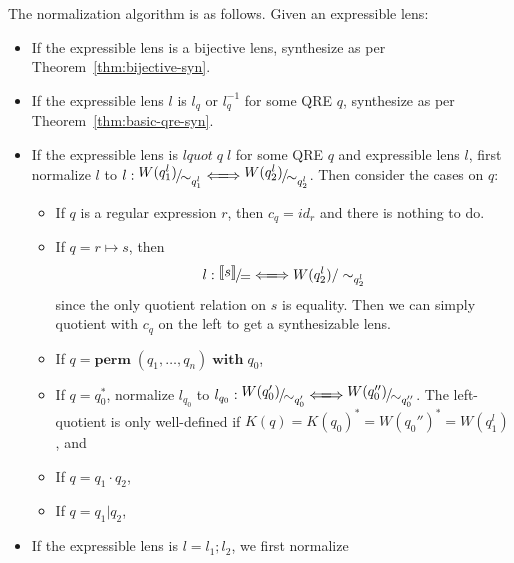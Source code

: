 \documentclass[a4paper,11pt] {article}
\theoremstyle{definition}
\newcommand{\lquot}{\textit{lquot}}
\newcommand{\lensbetween}[1]{\xLongleftrightarrow{#1}}
\newcommand{\perm}{ \textbf{perm}\; }
\newcommand{\with}{ \;\textbf{with}\; }
\newcommand{\niceFrac}[2]{%
    \raise.5ex\hbox{$#1$}%
    \kern-.1em/\kern-.15em%
    \lower.25ex\hbox{$#2$}}
\begin{document}
The normalization algorithm is as follows. Given an expressible lens:
\begin{itemize}
\item If the expressible lens is a bijective lens, synthesize as per
  Theorem~\ref{thm:bijective-syn}.
\item If the expressible lens $l$ is $l_q$ or $l_q^{-1}$ for some QRE
  $q$, synthesize as per Theorem~\ref{thm:basic-qre-syn}.
\item If the expressible lens is $\lquot \; q \; l$ for some QRE $q$
  and expressible lens $l$, first normalize $l$
  to $l: \niceFrac{W(q_1^l)}{\sim_{q_1^l}} \lensbetween{}
  \niceFrac{W(q_2^l)}{\sim_{q_2^l}}$. Then consider the
  cases on $q$:
  \begin{itemize}
  \item If $q$ is a regular expression $r$, then
    $c_q = \mathit{id}_{r}$ and there is nothing to do.
  \item If $q = r \mapsto s$, then
    \begin{align*}
      l: \niceFrac{\llbracket s \rrbracket}{=} \lensbetween{}
      W(q_2^l)/\sim_{q_2^l}
    \end{align*}
    since the only quotient relation on $s$ is equality.
    Then we can simply quotient with $c_q$ on the left to get
    a synthesizable lens.
    
  \item If $q = \perm(q_1, \ldots, q_n) \with q_0$,
    
    
  \item If $q = q_0^*$,
    normalize $l_{q_0}$ to
    $l_{q_0}: \niceFrac{W(q_0')}{\sim_{q_0'}} \lensbetween{}
    \niceFrac{W(q_0'')}{\sim_{q_0''}}$. 
    The left-quotient is only well-defined if
    $K(q) = K(q_0)^* = W(q_0'')^* = W(q_1^l)$, and
    
  \item If $q = q_1 \cdot q_2$,
  \item If $q = q_1 | q_2$, 
  \end{itemize}
\item If the expressible lens is $l = l_1; l_2$,
  we first normalize 
\end{itemize}
\end{document}
